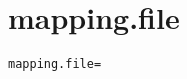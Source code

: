 \section{mapping.file}
\label{configuration:MappingFile}
\AvailableInJavaAndCsharp{\TODO}
\begin{lstlisting}[style=Props,caption={Usage example for \textit{mapping.file}}]
mapping.file=
\end{lstlisting}